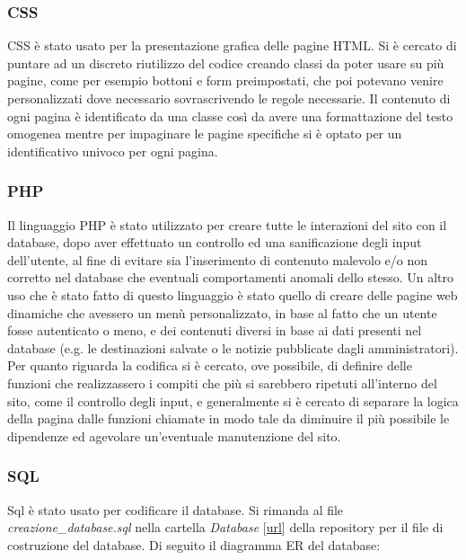 \documentclass{article}
\begin{document}
			\subsubsection{CSS}
				CSS è stato usato per la presentazione grafica delle pagine HTML. Si è cercato di puntare ad un discreto riutilizzo del codice creando classi da poter usare su più pagine, come per esempio bottoni e form preimpostati, che poi potevano venire personalizzati dove necessario sovrascrivendo le regole necessarie. Il contenuto di ogni pagina è identificato da una classe così da avere una formattazione del testo omogenea mentre per impaginare le pagine specifiche si è optato per un identificativo univoco per ogni pagina.
			
			\subsubsection{PHP}
				Il linguaggio PHP è stato utilizzato per creare tutte le interazioni del sito con il database, dopo aver effettuato un controllo ed una  sanificazione degli input dell'utente, al fine di evitare sia l'inserimento di contenuto malevolo e/o non corretto nel database che eventuali comportamenti anomali dello stesso.
				Un altro uso che è stato fatto di questo linguaggio è stato quello di creare delle pagine web dinamiche che avessero un menù personalizzato, in base al fatto che un utente fosse autenticato o meno, e dei contenuti diversi in base ai dati presenti nel database (e.g. le destinazioni salvate o le notizie pubblicate dagli amministratori).
				Per quanto riguarda la codifica si è cercato, ove possibile, di definire delle funzioni che realizzassero i compiti che più si sarebbero ripetuti all'interno del sito, come il controllo degli input, e generalmente si è cercato di separare la logica della pagina dalle funzioni chiamate in modo tale da diminuire il più possibile le dipendenze ed agevolare un'eventuale manutenzione del sito.
			
			\subsubsection{SQL}
				Sql è stato usato per codificare il database. Si rimanda al file \textit{creazione\_database.sql} nella cartella \textit{Database} [\href{https://github.com/Mirco469/ProgettoSushi/tree/master/Database}{url}] della repository per il file di costruzione del database. Di seguito il diagramma ER del database:\newline
			
\end{document}
